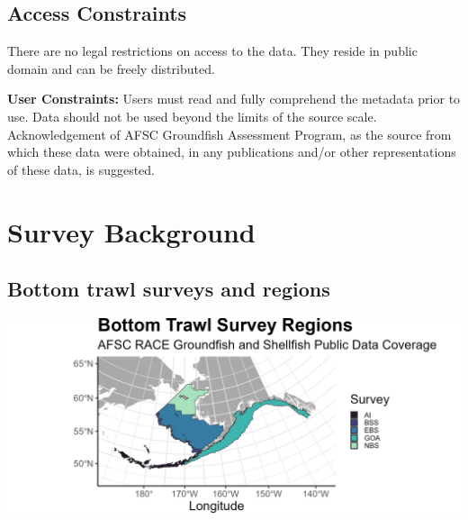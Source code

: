 \documentclass[
  letterpaper,
  oneside,
  open=any]{scrbook}
\begin{document}
\hypertarget{access-constraints}{%
\section*{Access Constraints}\label{access-constraints}}


There are no legal restrictions on access to the data. They reside in
public domain and can be freely distributed.

\textbf{User Constraints:} Users must read and fully comprehend the
metadata prior to use. Data should not be used beyond the limits of the
source scale. Acknowledgement of AFSC Groundfish Assessment Program, as
the source from which these data were obtained, in any publications
and/or other representations of these data, is suggested.

\hypertarget{survey-background}{%
\chapter{Survey Background}\label{survey-background}}

\hypertarget{bottom-trawl-surveys-and-regions}{%
\section{Bottom trawl surveys and
regions}\label{bottom-trawl-surveys-and-regions}}

\includegraphics[width=7in,height=\textheight]{content/../img/survey_plot.png}
\end{document}
